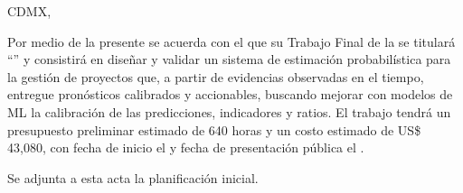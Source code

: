 \documentclass[12pt]
{charter}
\begin{document}
\begin{flushright}
CDMX, \fechaInicioName
\end{flushright}

\vspace{2cm}

Por medio de la presente se acuerda con el \authorname\hspace{1px} que su Trabajo Final de la \degreename\hspace{1px} se titulará ``\ttitle'' y consistirá en diseñar y validar un sistema de estimación probabilística para la gestión de proyectos que, a partir de evidencias observadas en el tiempo, entregue pronósticos calibrados y accionables, buscando mejorar con modelos de ML la calibración de las predicciones, indicadores y ratios. El trabajo tendrá un presupuesto preliminar estimado de 640 horas y un costo estimado de US\$ 43,080, con fecha de inicio el \fechaInicioName\hspace{1px} y fecha de presentación pública el \textcolor{red}{\fechaFinalName}.

Se adjunta a esta acta la planificación inicial.

\vfill

\end{document}
